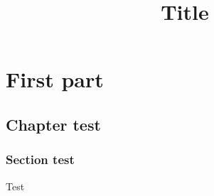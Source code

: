\documentclass[a4paper,12pt,twoside]{book}
\title{Title}
\begin{document}
\setlength{\baselineskip}{.55cm}



\newpage
\pagestyle{intr}

\newpage

\pagestyle{toc}
\tableofcontents
\newpage

\pagestyle{toenv}
\listoftheorems
\newpage

\pagestyle{nor}
\part{First part}
\chapter{Chapter test}
\section{Section test}
\begin{definition}
Test
\end{definition}

\stopcontents[parts]

\medskip
\printbibliography[heading=bibintoc]

\end{document}
